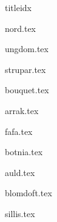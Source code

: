 \documentclass[a6paper,8pt,makeidx]{book}
\begin{document}
\begin{songs}{titleidx}

{nord.tex}
\sclearpage

{ungdom.tex}
\sclearpage

{strupar.tex}	
\sclearpage

{bouquet.tex}	
\sclearpage

{arrak.tex}	
\sclearpage

{fafa.tex}	
\sclearpage

{botnia.tex}	
\sclearpage

{auld.tex}	
\sclearpage

{blomdoft.tex}
\sclearpage

{sillis.tex}
\sclearpage

\end{songs}

\renewcommand{\idxtitlefont}{\rmfamily\mdseries}
\renewcommand{\idxlyricfont}{\rmfamily\mdseries}
\renewcommand{\idxheadfont}{\sffamily\it\large}
\setlength{\idxheadwidth}{0.5cm}
\end{document}
